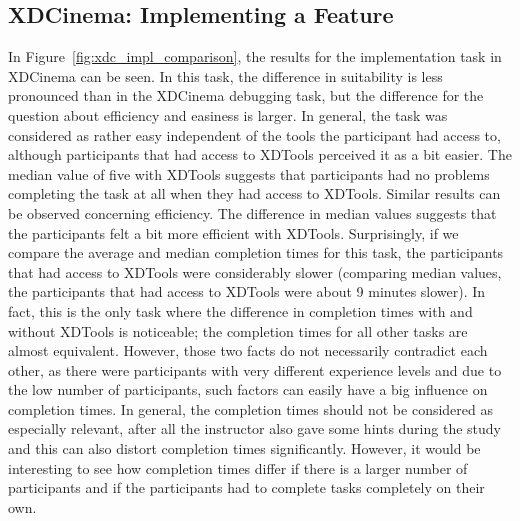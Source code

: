 \subsection{XDCinema: Implementing a Feature}

In Figure~\ref{fig:xdc_impl_comparison}, the results for the implementation task in XDCinema can be seen. In this task, the difference in suitability is less pronounced than in the XDCinema debugging task, but the difference for the question about efficiency and easiness is larger. In general, the task was considered as rather easy independent of the tools the participant had access to, although participants that had access to XDTools perceived it as a bit easier. The median value of five with XDTools suggests that participants had no problems completing the task at all when they had access to XDTools. Similar results can be observed concerning efficiency. The difference in median values suggests that the participants felt a bit more efficient with XDTools. Surprisingly, if we compare the average and median completion times for this task, the participants that had access to XDTools were considerably slower (comparing median values, the participants that had access to XDTools were about 9 minutes slower). In fact, this is the only task where the difference in completion times with and without XDTools is noticeable; the completion times for all other tasks are almost equivalent. However, those two facts do not necessarily contradict each other, as there were participants with very different experience levels and due to the low number of participants, such factors can easily have a big influence on completion times. In general, the completion times should not be considered as especially relevant, after all the instructor also gave some hints during the study and this can also distort completion times significantly. However, it would be interesting to see how completion times differ if there is a larger number of participants and if the participants had to complete tasks completely on their own. 


